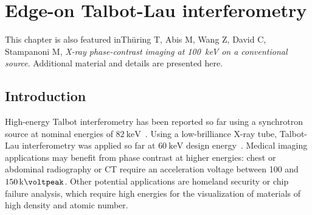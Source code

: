 \chapter{Edge-on Talbot-Lau interferometry}\label{ch:edgeon} %
This chapter is also featured in\cn Th\"uring T, Abis M, Wang Z, David C,
Stampanoni M, \emph{X-ray phase-contrast imaging at \SI{100}{\kilo\eV} on a
conventional source}. Additional material and details are presented here.

\section{Introduction}
High-energy Talbot interferometry has been reported so far using a
synchrotron source at nominal energies of
$\SI{82}{\kilo\electronvolt}$~\cite{Willner2013}. Using a low-brilliance
X-ray tube, Talbot-Lau interferometry was applied so far at
$\SI{60}{\kilo\electronvolt}$ design energy~\cite{Donath2009a}. Medical imaging
applications may benefit from phase contrast at higher energies: chest or
abdominal radiography or \ac{CT} require an acceleration voltage between
\num{100} and $\SI{150}{\kilo\voltpeak}$. Other potential applications are
homeland security or chip failure analysis, which require high energies for
the visualization of materials of high density and atomic number.

